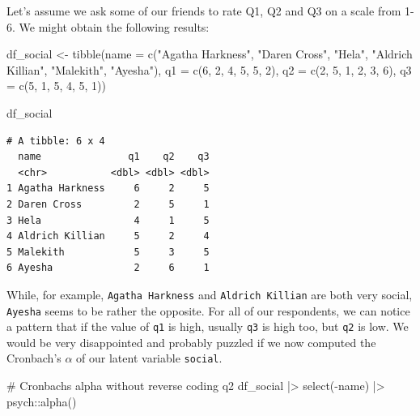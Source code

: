 \documentclass[
  letterpaper,
]{krantz}
\makeatletter
\newenvironment{Shaded}{\begin{snugshade}}{\end{snugshade}}
\newcommand{\AttributeTok}[1]{\textcolor[rgb]{0.40,0.45,0.13}{#1}}
\newcommand{\CommentTok}[1]{\textcolor[rgb]{0.37,0.37,0.37}{#1}}
\newcommand{\DecValTok}[1]{\textcolor[rgb]{0.68,0.00,0.00}{#1}}
\newcommand{\FunctionTok}[1]{\textcolor[rgb]{0.28,0.35,0.67}{#1}}
\newcommand{\NormalTok}[1]{\textcolor[rgb]{0.00,0.23,0.31}{#1}}
\newcommand{\OtherTok}[1]{\textcolor[rgb]{0.00,0.23,0.31}{#1}}
\newcommand{\SpecialCharTok}[1]{\textcolor[rgb]{0.37,0.37,0.37}{#1}}
\newcommand{\StringTok}[1]{\textcolor[rgb]{0.13,0.47,0.30}{#1}}
\newenvironment{kframe}{%
\medskip{}
\setlength{\fboxsep}{.8em}
 \def\at@end@of@kframe{}%
 \ifinner\ifhmode%
  \def\at@end@of@kframe{\end{minipage}}%
  \begin{minipage}{\columnwidth}%
 \fi\fi%
 \def\FrameCommand##1{\hskip\@totalleftmargin \hskip-\fboxsep
 \colorbox{shadecolor}{##1}\hskip-\fboxsep
     \hskip-\linewidth \hskip-\@totalleftmargin \hskip\columnwidth}%
 \MakeFramed {\advance\hsize-\width
   \@totalleftmargin\z@ \linewidth\hsize
   \@setminipage}}%
 {\par\unskip\endMakeFramed%
 \at@end@of@kframe}
\renewenvironment{Shaded}{\begin{kframe}}{\end{kframe}}
\makeatother
\begin{document}
Let's assume we ask some of our friends to rate Q1, Q2 and Q3 on a scale
from 1-6. We might obtain the following results:

\begin{Shaded}
\begin{Highlighting}[]
\NormalTok{df\_social }\OtherTok{\textless{}{-}} \FunctionTok{tibble}\NormalTok{(}\AttributeTok{name =} \FunctionTok{c}\NormalTok{(}\StringTok{"Agatha Harkness"}\NormalTok{, }\StringTok{"Daren Cross"}\NormalTok{, }\StringTok{"Hela"}\NormalTok{,}
                             \StringTok{"Aldrich Killian"}\NormalTok{, }\StringTok{"Malekith"}\NormalTok{, }\StringTok{"Ayesha"}\NormalTok{),}
                    \AttributeTok{q1 =} \FunctionTok{c}\NormalTok{(}\DecValTok{6}\NormalTok{, }\DecValTok{2}\NormalTok{, }\DecValTok{4}\NormalTok{, }\DecValTok{5}\NormalTok{, }\DecValTok{5}\NormalTok{, }\DecValTok{2}\NormalTok{),}
                    \AttributeTok{q2 =} \FunctionTok{c}\NormalTok{(}\DecValTok{2}\NormalTok{, }\DecValTok{5}\NormalTok{, }\DecValTok{1}\NormalTok{, }\DecValTok{2}\NormalTok{, }\DecValTok{3}\NormalTok{, }\DecValTok{6}\NormalTok{),}
                    \AttributeTok{q3 =} \FunctionTok{c}\NormalTok{(}\DecValTok{5}\NormalTok{, }\DecValTok{1}\NormalTok{, }\DecValTok{5}\NormalTok{, }\DecValTok{4}\NormalTok{, }\DecValTok{5}\NormalTok{, }\DecValTok{1}\NormalTok{))}

\NormalTok{df\_social}
\end{Highlighting}
\end{Shaded}

\begin{verbatim}
# A tibble: 6 x 4
  name               q1    q2    q3
  <chr>           <dbl> <dbl> <dbl>
1 Agatha Harkness     6     2     5
2 Daren Cross         2     5     1
3 Hela                4     1     5
4 Aldrich Killian     5     2     4
5 Malekith            5     3     5
6 Ayesha              2     6     1
\end{verbatim}

While, for example, \texttt{Agatha\ Harkness} and
\texttt{Aldrich\ Killian} are both very social, \texttt{Ayesha} seems to
be rather the opposite. For all of our respondents, we can notice a
pattern that if the value of \texttt{q1} is high, usually \texttt{q3} is
high too, but \texttt{q2} is low. We would be very disappointed and
probably puzzled if we now computed the Cronbach's \(\alpha\) of our
latent variable \texttt{social}.

\begin{Shaded}
\begin{Highlighting}[]
\CommentTok{\# Cronbach\textquotesingle{}s alpha without reverse coding q2}
\NormalTok{df\_social }\SpecialCharTok{|\textgreater{}}
  \FunctionTok{select}\NormalTok{(}\SpecialCharTok{{-}}\NormalTok{name) }\SpecialCharTok{|\textgreater{}}
\NormalTok{  psych}\SpecialCharTok{::}\FunctionTok{alpha}\NormalTok{()}
\end{Highlighting}
\end{Shaded}
\end{document}
